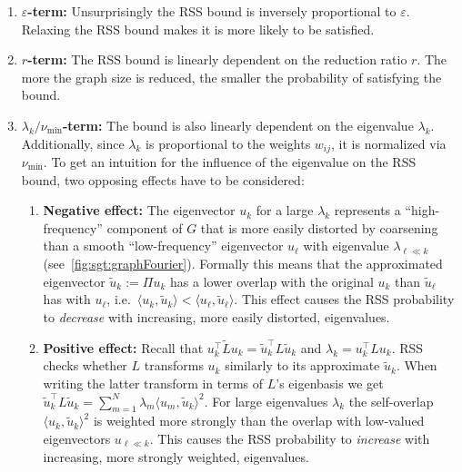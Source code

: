 \begin{enumerate}[label=\textbf{\arabic*.}]
	\item \textbf{$\varepsilon$-term:}
		Unsurprisingly the RSS bound is inversely proportional to $\varepsilon$.
		Relaxing the RSS bound makes it is more likely to be satisfied.
	\item \textbf{$r$-term:}
		The RSS bound is linearly dependent on the reduction ratio $r$.
		The more the graph size is reduced, the smaller the probability of satisfying the bound.
	\item \textbf{$\lambda_k / \nu_{\text{min}}$-term:}
		The bound is also linearly dependent on the eigenvalue $\lambda_k$.
		Additionally, since $\lambda_k$ is proportional to the weights $w_{i j}$, it is normalized via $\nu_{\text{min}}$.
		To get an intuition for the influence of the eigenvalue on the RSS bound, two opposing effects have to be considered:
		\begin{enumerate}[label=(\roman*)] %
			\item \textbf{Negative effect:}\label{itm:cons:bound:neg}
				The eigenvector $u_k$ for a large $\lambda_k$ represents a ``high-frequency'' component of $G$ that is more easily distorted by coarsening than a smooth ``low-frequency'' eigenvector $u_\ell$ with eigenvalue $\lambda_{\ell \ll k}$ (see~\cref{fig:sgt:graphFourier}).
				Formally this means that the approximated eigenvector $\widetilde{u}_k := \Pi u_k$ has a lower overlap with the original $u_k$ than $\widetilde{u}_\ell$ has with $u_\ell$, i.e.\ $\langle u_k, \widetilde{u}_k \rangle < \langle u_\ell, \widetilde{u}_\ell \rangle$.
				This effect causes the RSS probability to \textit{decrease} with increasing, more easily distorted, eigenvalues.
			\item \textbf{Positive effect:}\label{itm:cons:bound:pos}
				Recall that $u_k^\top \widetilde{L} u_k = \widetilde{u}_k^\top L \widetilde{u}_k$ and $\lambda_k = u_k^\top L u_k$.
				RSS checks whether $L$ transforms $u_k$ similarly to its approximate $\widetilde{u}_k$.
				When writing the latter transform in terms of $L$'s eigenbasis we get $\widetilde{u}_k^\top L \widetilde{u}_k = \sum_{m = 1}^N \lambda_m \langle u_m, \widetilde{u}_k \rangle^2$.
				For large eigenvalues $\lambda_k$ the self-overlap $\langle u_k, \widetilde{u}_k \rangle^2$ is weighted more strongly than the overlap with low-valued eigenvectors $u_{\ell \ll k}$.
				This causes the RSS probability to \textit{increase} with increasing, more strongly weighted, eigenvalues.
		\end{enumerate}

\end{enumerate}
